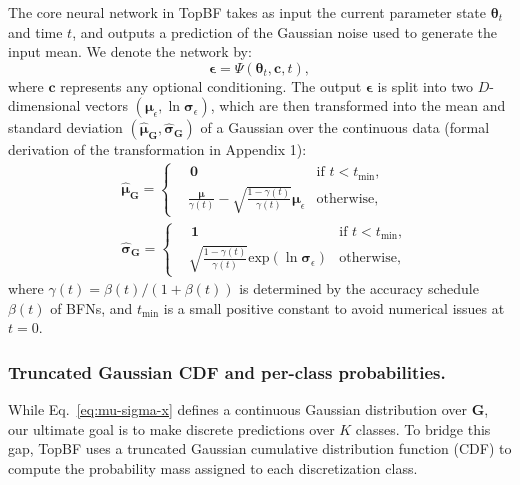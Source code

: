 \documentclass[journal,twoside,web]{ieeecolor}
\begin{document}
The core neural network in TopBF takes as input the current parameter state $\boldsymbol{\theta}_t$ and time $t$, and outputs a prediction of the Gaussian noise used to generate the input mean. We denote the network by:
\begin{equation}
    \boldsymbol{\epsilon} = \Psi(\boldsymbol{\theta}_t, \mathbf{c}, t),
\end{equation}
where $\mathbf{c}$ represents any optional conditioning. The output $\boldsymbol{\epsilon}$ is split into two $D$-dimensional vectors $(\boldsymbol{\mu}_\epsilon, \ln \boldsymbol{\sigma}_\epsilon)$, which are then transformed into the mean and standard deviation $(\hat{\boldsymbol{\mu}}_\mathbf{G}, \hat{\boldsymbol{\sigma}}_\mathbf{G})$ of a Gaussian over the continuous data (formal derivation of the transformation in Appendix 1):
\begin{equation}
    \begin{aligned}
        & \hat{\boldsymbol{\mu}}_\mathbf{G} = \left\{
    \begin{aligned}
        & \, \boldsymbol{0} & \text{if $t<t_{\text{min}}$},\\
        & \frac{\boldsymbol{\mu}}{\gamma(t)} - \sqrt{\frac{1-\gamma(t)}{\gamma(t)}}\boldsymbol{\mu}_\epsilon & \text{otherwise,}
    \end{aligned}
    \right. \\
    & \hat{\boldsymbol{\sigma}}_\mathbf{G} = \left\{
    \begin{aligned}
        & \, \boldsymbol{1} & \text{if $t<t_{\text{min}}$},\\
        & \sqrt{\frac{1-\gamma(t)}{\gamma(t)}}\text{exp}(\ln\boldsymbol{\sigma}_\epsilon) & \text{otherwise,}
    \end{aligned}
    \right.
    \end{aligned}
\label{eq:mu-sigma-x}
\end{equation}
where $\gamma(t) = \beta(t)/(1 + \beta(t))$ is determined by the accuracy schedule $\beta(t)$ of BFNs, and $t_{\min}$ is a small positive constant to avoid numerical issues at $t=0$.




\subsubsection{Truncated Gaussian CDF and per-class probabilities.}
While Eq.~\eqref{eq:mu-sigma-x} defines a continuous Gaussian distribution over $\mathbf{G}$, our ultimate goal is to make discrete predictions over $K$ classes. To bridge this gap, TopBF uses a truncated Gaussian cumulative distribution function (CDF) to compute the probability mass assigned to each discretization class.
\end{document}
